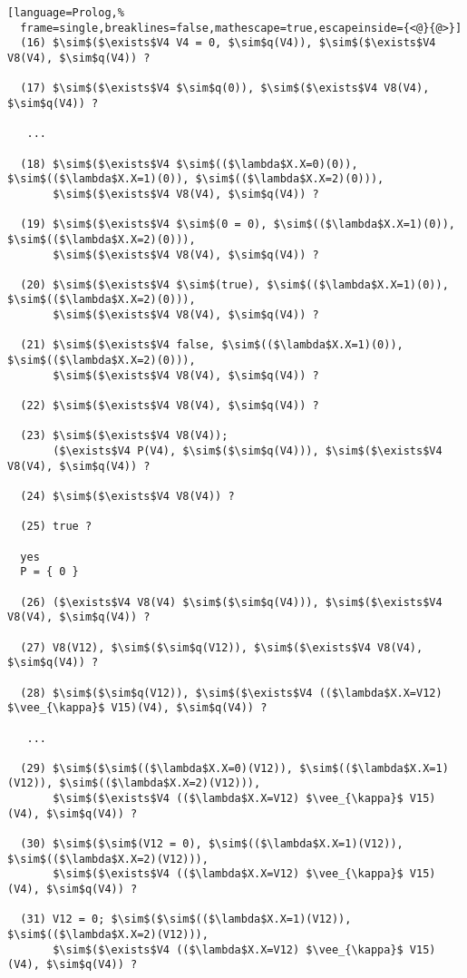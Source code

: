 \documentclass[inscr,ack,preface]{dithesis}
\theoremstyle{definition}
\begin{document}
\begin{lstlisting}[language=Prolog,%
  frame=single,breaklines=false,mathescape=true,escapeinside={<@}{@>}]
  (16) $\sim$($\exists$V4 V4 = 0, $\sim$q(V4)), $\sim$($\exists$V4 V8(V4), $\sim$q(V4)) ?

  (17) $\sim$($\exists$V4 $\sim$q(0)), $\sim$($\exists$V4 V8(V4), $\sim$q(V4)) ?

   ...

  (18) $\sim$($\exists$V4 $\sim$(($\lambda$X.X=0)(0)), $\sim$(($\lambda$X.X=1)(0)), $\sim$(($\lambda$X.X=2)(0))),
       $\sim$($\exists$V4 V8(V4), $\sim$q(V4)) ?

  (19) $\sim$($\exists$V4 $\sim$(0 = 0), $\sim$(($\lambda$X.X=1)(0)), $\sim$(($\lambda$X.X=2)(0))),
       $\sim$($\exists$V4 V8(V4), $\sim$q(V4)) ?

  (20) $\sim$($\exists$V4 $\sim$(true), $\sim$(($\lambda$X.X=1)(0)), $\sim$(($\lambda$X.X=2)(0))),
       $\sim$($\exists$V4 V8(V4), $\sim$q(V4)) ?

  (21) $\sim$($\exists$V4 false, $\sim$(($\lambda$X.X=1)(0)), $\sim$(($\lambda$X.X=2)(0))),
       $\sim$($\exists$V4 V8(V4), $\sim$q(V4)) ?

  (22) $\sim$($\exists$V4 V8(V4), $\sim$q(V4)) ?

  (23) $\sim$($\exists$V4 V8(V4));
       ($\exists$V4 P(V4), $\sim$($\sim$q(V4))), $\sim$($\exists$V4 V8(V4), $\sim$q(V4)) ?

  (24) $\sim$($\exists$V4 V8(V4)) ?

  (25) true ?

  yes
  P = { 0 }

  (26) ($\exists$V4 V8(V4) $\sim$($\sim$q(V4))), $\sim$($\exists$V4 V8(V4), $\sim$q(V4)) ?

  (27) V8(V12), $\sim$($\sim$q(V12)), $\sim$($\exists$V4 V8(V4), $\sim$q(V4)) ?

  (28) $\sim$($\sim$q(V12)), $\sim$($\exists$V4 (($\lambda$X.X=V12) $\vee_{\kappa}$ V15)(V4), $\sim$q(V4)) ?

   ...

  (29) $\sim$($\sim$(($\lambda$X.X=0)(V12)), $\sim$(($\lambda$X.X=1)(V12)), $\sim$(($\lambda$X.X=2)(V12))),
       $\sim$($\exists$V4 (($\lambda$X.X=V12) $\vee_{\kappa}$ V15)(V4), $\sim$q(V4)) ?

  (30) $\sim$($\sim$(V12 = 0), $\sim$(($\lambda$X.X=1)(V12)), $\sim$(($\lambda$X.X=2)(V12))),
       $\sim$($\exists$V4 (($\lambda$X.X=V12) $\vee_{\kappa}$ V15)(V4), $\sim$q(V4)) ?

  (31) V12 = 0; $\sim$($\sim$(($\lambda$X.X=1)(V12)), $\sim$(($\lambda$X.X=2)(V12))),
       $\sim$($\exists$V4 (($\lambda$X.X=V12) $\vee_{\kappa}$ V15)(V4), $\sim$q(V4)) ?


\end{lstlisting}
\end{document}
